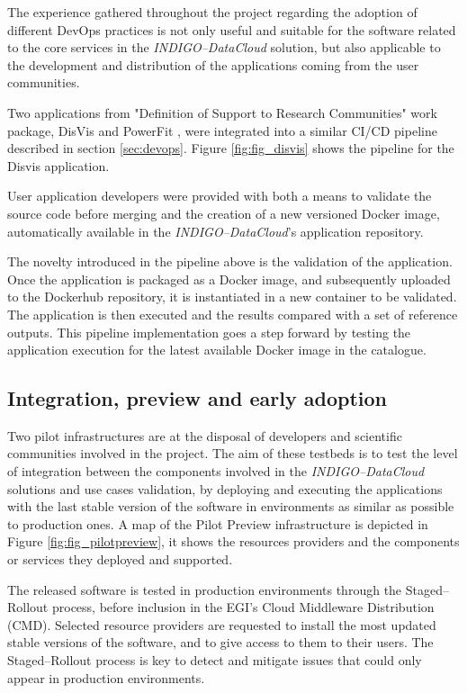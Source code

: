 \documentclass[journal]{IEEEtran}
\begin{document}
The experience gathered throughout the project regarding the adoption of
different DevOps practices is not only useful and suitable for the software related
to the core services in the {\sl INDIGO--DataCloud} solution, but also applicable to the
development and distribution of the applications coming from the user communities.

Two applications from "Definition of Support to Research Communities" work package,
DisVis \cite{disvis} and PowerFit \cite{powerfit}, were
integrated into a similar CI/CD pipeline described in section \ref{sec:devops}.
Figure \ref{fig:fig_disvis} shows the pipeline for the Disvis application.

User application developers were provided with both a means to validate the
source code before merging and the creation of a new versioned Docker image,
automatically available in the {\sl INDIGO--DataCloud}’s application repository.

The novelty introduced in the pipeline above is the validation of the application.
Once the application is packaged as a Docker image, and subsequently uploaded
to the Dockerhub repository, it is instantiated in a new container to be validated.
The application is then executed and the results compared with a set of reference outputs.
This pipeline implementation goes a step forward by testing the application
execution for the latest available Docker image in the catalogue.


\subsection{Integration, preview and early adoption}

Two pilot infrastructures are at the disposal of developers and scientific
communities involved in the project. The aim of these testbeds is to test the
level of integration between the components involved in the {\sl INDIGO--DataCloud}
solutions and use cases validation, by deploying and executing the applications
with the last stable version of the software in environments as similar as
possible to production ones. A map of the Pilot Preview
infrastructure is depicted in Figure \ref{fig:fig_pilotpreview}, it shows the
resources providers and the components or services they deployed and supported.

The released software is tested in production environments through the
Staged--Rollout process, before inclusion in the EGI's Cloud Middleware Distribution (CMD).
Selected resource providers are requested to install
the most updated stable versions of the software, and to give access to them to their users. The
Staged--Rollout process is key to detect and mitigate issues that could only
appear in production environments.
\end{document}
